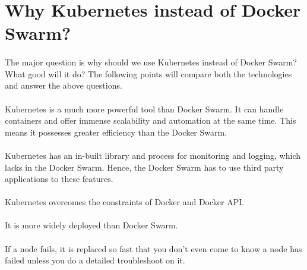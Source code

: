 \section{Why Kubernetes instead of Docker Swarm?}

\paragraph{\hspace{24pt}}
The major question is why should we use Kubernetes instead of Docker Swarm? What good will it do? The following points will compare both the technologies and answer the above questions.

\paragraph{\hspace{24pt}}
Kubernetes is a much more powerful tool than Docker Swarm. It can handle containers and offer immense scalability and automation at the same time. This means it possesses greater efficiency than the Docker Swarm.

\paragraph{\hspace{24pt}}
Kubernetes has an in-built library and process for monitoring and logging, which lacks in the Docker Swarm. Hence, the Docker Swarm has to use third party applications to these features.

\paragraph{\hspace{24pt}}
Kubernetes overcomes the constraints of Docker and Docker API.

\paragraph{\hspace{24pt}}
It is more widely deployed than Docker Swarm.

\paragraph{\hspace{24pt}}
If a node fails, it is replaced so fast that you don’t even come to know a node has failed unless you do a detailed troubleshoot on it.

